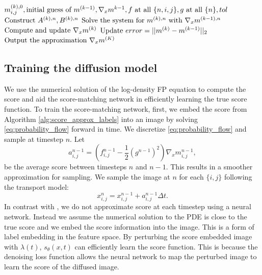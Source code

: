 \documentclass[]{interact}
\theoremstyle{plain}%
\theoremstyle{definition}
\theoremstyle{remark}
\begin{document}
\begin{algorithm}[htbp!]
\caption{Pre-training: Policy iteration to approximate score from log-density FP equation. We denote the last iteration as $K$.}\label{alg:score_approx_labels}
\begin{algorithmic}
\Require $m^{(k),0}_{i,j},\textnormal{initial guess of }m^{(k-1)}, \nabla_x m^{k-1}, f\textnormal{ at all }\{n, i,j\}, g\textnormal{ at all }\{n\}, tol$
\State $\textnormal{Construct }A^{(k),n}, B^{(k),n}$
\State $\textnormal{Solve the system for }m^{(k),n}\textnormal{ with }\nabla_x m^{(k-1),n}$
\EndWhile
\State $\textnormal{Compute and update }\nabla_x m^{(k)}$
\State $\textnormal{Update }error = ||m^{(k)} - m^{(k-1)}||_2$
\EndWhile
\State $\textnormal{Output the approximation }\nabla_x m^{(K)}$
\end{algorithmic}
\end{algorithm}

\subsection{Training the diffusion model}
We use the numerical solution of the log-density FP equation to compute the score and aid the score-matching network in efficiently learning the true score function. To train the score-matching network, first, we embed the score from Algorithm \ref{alg:score_approx_labels} into an image by solving \eqref{eq:probability_flow} forward in time. We discretize \eqref{eq:probability_flow} and sample at timestep $n$. Let
\begin{equation}
    a^{n-1}_{i,j} = (f^{n-1}_{i,j} - \frac{1}{2}(g^{n-1})^2)\nabla_x m^{n-1}_{i,j},
\end{equation}
be the average score between timesteps $n$ and $n-1$. This results in a smoother approximation for sampling. We sample the image at $n$ for each $\{i,j\}$ following the transport model:
\begin{equation}
    x^n_{i,j} = x^{n-1}_{i,j} + a^{n-1}_{i,j}\Delta t.
\end{equation}
In contrast with \cite{boffi-2022}, we do not approximate score at each timestep using a neural network. Instead we assume the numerical solution to the PDE is close to the true score and we embed the score information into the image. This is a form of label embedding in the feature space. By perturbing the score embedded image with $\lambda(t)$, $s_\theta(x,t)$ can efficiently learn the score function. This is because the denoising loss function allows the neural network to map the perturbed image to learn the score of the diffused image.
\end{document}
